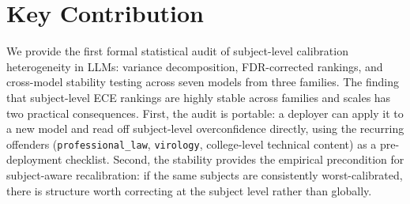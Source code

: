 \documentclass{article}
\begin{document}
\section{Key Contribution}

We provide the first formal statistical audit of subject-level calibration
heterogeneity in LLMs: variance decomposition, FDR-corrected rankings, and
cross-model stability testing across seven models from three families. The
finding that subject-level ECE rankings are highly stable across families and
scales has two practical consequences. First, the audit is portable: a deployer
can apply it to a new model and read off subject-level overconfidence directly,
using the recurring offenders (\texttt{professional\_law}, \texttt{virology},
college-level technical content) as a pre-deployment checklist. Second, the
stability provides the empirical precondition for subject-aware recalibration:
if the same subjects are consistently worst-calibrated, there is structure worth
correcting at the subject level rather than globally.



\end{document}

